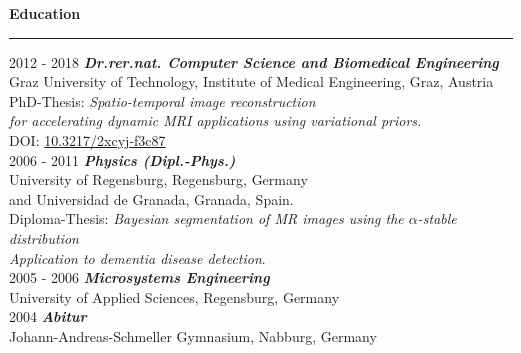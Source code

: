\vspace{0.7cm}
{\bf Education\\}
\noindent\rule{\textwidth}{0.5pt}
\begin{tabbing}  
	2012 - 2018 \quad \= \emph{\textbf{Dr.rer.nat. Computer Science and Biomedical Engineering}} \\
  	\> Graz University of Technology, Institute of Medical Engineering, Graz, Austria  \\ %
  	\> PhD-Thesis: \emph{Spatio-temporal image reconstruction} \\
  	\> \emph{for accelerating dynamic MRI applications using variational priors.} \\
  	\> DOI: \href{https://doi.org/10.3217/2xcyj-f3c87}{10.3217/2xcyj-f3c87} \\

	2006 - 2011 \quad \= \emph{\textbf{Physics (Dipl.-Phys.)}} \\ %
  	\> University of Regensburg, Regensburg, Germany \\
	\> and Universidad de Granada, Granada, Spain. \\
	\> Diploma-Thesis: \emph{Bayesian segmentation of MR images using the $\alpha$-stable distribution}\\
	\> \emph{Application to dementia disease detection}. \\
  
	2005 - 2006 \quad \= \emph{\textbf{Microsystems Engineering}} \\
	\> University of Applied Sciences, Regensburg, Germany \\
 
	2004 \quad \quad \quad \quad \= \emph{\textbf{Abitur}}\\  
	\> Johann-Andreas-Schmeller Gymnasium, Nabburg, Germany %
 
\end{tabbing}
\bigskip


